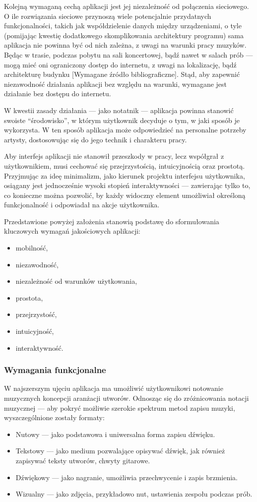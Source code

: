 Kolejną wymaganą cechą aplikacji jest jej niezależność od połączenia sieciowego.
O ile rozwiązania sieciowe przynoszą wiele potencjalnie przydatnych funkcjonalności,
takich jak współdzielenie danych między urządzeniami,
o tyle (pomijając kwestię dodatkowego skomplikowania architektury programu)
sama aplikacja nie powinna być od nich zależna, z uwagi na warunki pracy muzyków.
Będąc w trasie, podczas pobytu na sali koncertowej, bądź nawet w salach prób — mogą mieć oni ograniczony dostęp do internetu,
z uwagi na lokalizację, bądź architekturę budynku [Wymagane źródło bibliograficzne].
Stąd, aby zapewnić niezawodność działania aplikacji bez względu na warunki, wymagane jest działanie bez dostępu do internetu.

W kwestii zasady działania — jako notatnik — aplikacja powinna stanowić swoiste \enquote{środowisko},
w którym użytkownik decyduje o tym, w jaki sposób je wykorzysta.
W ten sposób aplikacja może odpowiedzieć na personalne potrzeby artysty, dostosowując się do jego technik i charakteru pracy.

Aby interfejs aplikacji nie stanowił przeszkody w pracy, lecz współgrał z użytkownikiem, musi cechować się przejrzystością,
intuicyjnością oraz prostotą.
Przyjmując za ideę minimalizm, jako kierunek projektu interfejsu użytkownika, osiągany jest jednocześnie wysoki stopień
interaktywności — zawierając tylko to, co konieczne można pozwolić, by każdy widoczny element umożliwiał określoną
funkcjonalność i odpowiadał na akcje użytkownika.

Przedstawione powyżej założenia stanowią podstawę do sformułowania kluczowych wymagań jakościowych aplikacji:
\begin{itemize}
	\item mobilność,
	\item niezawodność,
	\item niezależność od warunków użytkowania,
	\item prostota,
	\item przejrzystość,
	\item intuicyjność,
	\item interaktywność.
\end{itemize}

\subsubsection{Wymagania funkcjonalne}
W najszerszym ujęciu aplikacja ma umożliwić użytkownikowi notowanie muzycznych koncepcji aranżacji utworów.
Odnosząc się do zróżnicowania notacji muzycznej — aby pokryć możliwie szerokie spektrum metod zapisu muzyki,
wyszczególnione zostały formaty:
\begin{itemize}
	\item Nutowy — jako podstawowa i uniwersalna forma zapisu dźwięku.
	\item Tekstowy — jako medium pozwalające opisywać dźwięk, jak również zapisywać teksty utworów, chwyty gitarowe.
	\item Dźwiękowy — jako nagranie, umożliwia przechwycenie i zapis brzmienia.
	\item Wizualny — jako zdjęcia, przykładowo nut, ustawienia zespołu podczas prób.
\end{itemize}

